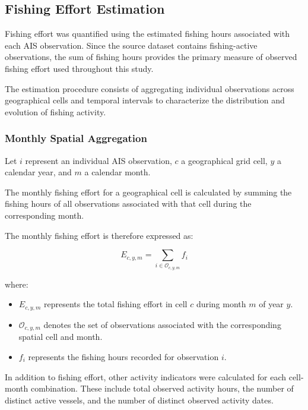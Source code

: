 \documentclass[pdflatex,sn-mathphys-num]{sn-jnl}
\theoremstyle{thmstyleone}
\theoremstyle{thmstyletwo}
\theoremstyle{thmstylethree}
\begin{document}
\subsection{Fishing Effort Estimation}\label{subsec:fishing-effort}

Fishing effort was quantified using the estimated
fishing hours associated with each AIS observation.
Since the source dataset contains fishing-active
observations, the sum of fishing hours provides the
primary measure of observed fishing effort used
throughout this study.

The estimation procedure consists of aggregating
individual observations across geographical cells
and temporal intervals to characterize the distribution
and evolution of fishing activity.


\subsubsection{Monthly Spatial Aggregation}

Let $i$ represent an individual AIS observation,
$c$ a geographical grid cell, $y$ a calendar year,
and $m$ a calendar month.

The monthly fishing effort for a geographical cell
is calculated by summing the fishing hours of all
observations associated with that cell during the
corresponding month.

The monthly fishing effort is therefore expressed as:

\begin{equation}
E_{c,y,m} =
\sum_{i \in \mathcal{O}_{c,y,m}}
f_i
\label{eq:monthly-effort}
\end{equation}

where:

\begin{itemize}
    \item $E_{c,y,m}$ represents the total fishing effort
    in cell $c$ during month $m$ of year $y$.

    \item $\mathcal{O}_{c,y,m}$ denotes the set of
    observations associated with the corresponding
    spatial cell and month.

    \item $f_i$ represents the fishing hours recorded
    for observation $i$.
\end{itemize}

In addition to fishing effort, other activity indicators
were calculated for each cell-month combination.
These include total observed activity hours, the
number of distinct active vessels, and the number
of distinct observed activity dates.
\end{document}
